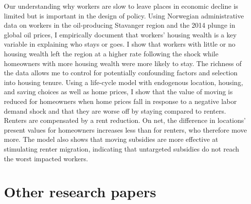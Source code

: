\documentclass{clean_CV}
\begin{document}
Our understanding why workers are slow to leave places in economic decline is limited but is important in the design of policy. Using Norwegian administrative data on workers in the oil-producing Stavanger region and the 2014 plunge in global oil prices, I empirically document that workers' housing wealth is a key variable in explaining who stays or goes. I show that workers with little or no housing wealth left the region at a higher rate following the shock while homeowners with more housing wealth were more likely to stay. The richness of the data allows me to control for potentially confounding factors and selection into housing tenure. Using a life-cycle model with endogenous location, housing, and saving choices as well as home prices, I show that the value of moving is reduced for homeowners when home prices fall in response to a negative labor demand shock and that they are worse off by staying compared to renters. Renters are compensated by a rent reduction. On net, the difference in locations' present values for homeowners increases less than for renters, who therefore move more. The model also shows that moving subsidies are more effective at stimulating renter migration, indicating that untargeted subsidies do not reach the worst impacted workers.




\section{Other research papers}
\end{document}

